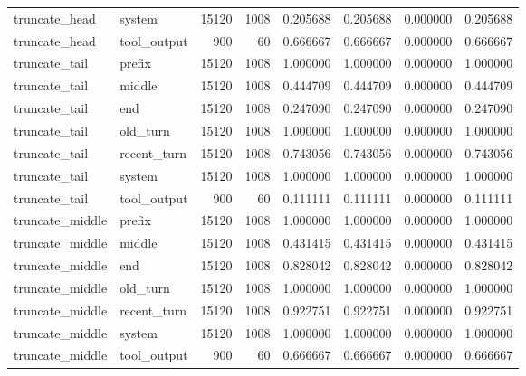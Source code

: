 \begin{tabular}{llrrrrrr}
truncate_head & system & 15120 & 1008 & 0.205688 & 0.205688 & 0.000000 & 0.205688 \\
truncate_head & tool_output & 900 & 60 & 0.666667 & 0.666667 & 0.000000 & 0.666667 \\
truncate_tail & prefix & 15120 & 1008 & 1.000000 & 1.000000 & 0.000000 & 1.000000 \\
truncate_tail & middle & 15120 & 1008 & 0.444709 & 0.444709 & 0.000000 & 0.444709 \\
truncate_tail & end & 15120 & 1008 & 0.247090 & 0.247090 & 0.000000 & 0.247090 \\
truncate_tail & old_turn & 15120 & 1008 & 1.000000 & 1.000000 & 0.000000 & 1.000000 \\
truncate_tail & recent_turn & 15120 & 1008 & 0.743056 & 0.743056 & 0.000000 & 0.743056 \\
truncate_tail & system & 15120 & 1008 & 1.000000 & 1.000000 & 0.000000 & 1.000000 \\
truncate_tail & tool_output & 900 & 60 & 0.111111 & 0.111111 & 0.000000 & 0.111111 \\
truncate_middle & prefix & 15120 & 1008 & 1.000000 & 1.000000 & 0.000000 & 1.000000 \\
truncate_middle & middle & 15120 & 1008 & 0.431415 & 0.431415 & 0.000000 & 0.431415 \\
truncate_middle & end & 15120 & 1008 & 0.828042 & 0.828042 & 0.000000 & 0.828042 \\
truncate_middle & old_turn & 15120 & 1008 & 1.000000 & 1.000000 & 0.000000 & 1.000000 \\
truncate_middle & recent_turn & 15120 & 1008 & 0.922751 & 0.922751 & 0.000000 & 0.922751 \\
truncate_middle & system & 15120 & 1008 & 1.000000 & 1.000000 & 0.000000 & 1.000000 \\
truncate_middle & tool_output & 900 & 60 & 0.666667 & 0.666667 & 0.000000 & 0.666667 \\
\bottomrule
\end{tabular}
